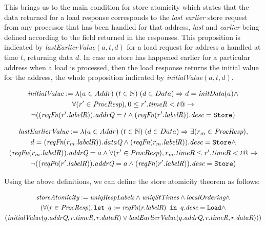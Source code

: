This brings us to the main condition for store atomicity which states that the
data returned for a load response corresponds to the \emph{last earlier} store
request from any processor that has been handled for that address,
\emph{last} and \emph{earlier} being defined according to the field \timeR{}
returned in the responses.  This proposition is indicated by
\textit{lastEarlierValue}$(a, t, d)$ for a load request for address $a$ handled
at time $t$, returning data $d$.  In case no store has happened earlier for a
particular address when a load is processed, then the load response returns the
initial value for the address, the whole proposition indicated by
\textit{initialValue}$(a, t, d)$.
\begin{defn}
\small
\begin{multline*}
\textit{initialValue} := \lambda (a \in Addr)\; (t \in \mathbb{N}) \; (d \in Data)\Rightarrow
d = \textit{initData} (a) \wedge \\
\forall (r' \in \textit{ProcResp}), 0 \le r'.\textit{timeR} < t @->\\
\neg ((\textit{reqFn} (r'.\textit{labelR})).\textit{addrQ} = t \wedge (\textit{reqFn} (r'.\textit{labelR})).\textit{desc} = \texttt{Store})
\end{multline*}
\label{initialValue}
\end{defn}

\begin{defn}
\small
\begin{multline*}
\textit{lastEarlierValue} := \lambda (a \in Addr)\; (t \in \mathbb{N}) \; (d \in Data)\Rightarrow
\exists (r_m \in \textit{ProcResp}),\\ d = (\textit{reqFn} (r_m.\textit{labelR})).\textit{dataQ} \wedge 
(\textit{reqFn} (r_m.\textit{labelR})).\textit{desc} = \texttt{Store} \wedge\\ (\textit{reqFn} (r_m.\textit{labelR})).\textit{addrQ} = a \wedge
\forall (r' \in \textit{ProcResp}), r_m.\textit{timeR} \le r'.\textit{timeR} < t @->\\
\neg ((\textit{reqFn} (r'.\textit{labelR})).\textit{addrQ} = a \wedge (\textit{reqFn} (r'.\textit{labelR})).\textit{desc} = \texttt{Store})
\end{multline*}
\label{lastEarlierValue}
\end{defn}

Using the above definitions, we can define the store atomicity theorem as follows:
\begin{thm}
\small
\begin{multline*}
\textit{storeAtomicity} := 
\textit{uniqRespLabels} \wedge
\textit{uniqStTimes} \wedge \textit{localOrdering} \wedge \\
(\forall (r \in \textit{ProcResp}), \texttt{let } q := \textit{reqFn}(r.\textit{labelR}) \texttt{ in } q.\textit{desc} = \texttt{Load} \wedge \\
(\textit{initialValue}(q.\textit{addrQ}, r.\textit{timeR}, r.\textit{dataR}) \vee \textit{lastEarlierValue}(q.\textit{addrQ}, r.\textit{timeR}, r.\textit{dataR})))
\end{multline*}
\label{storeAtomicity}
\end{thm}
